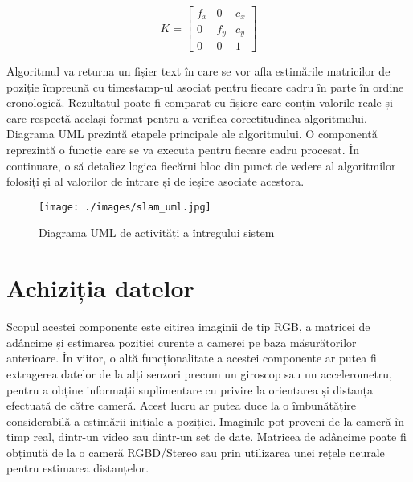 \documentclass[12pt,a4paper]{report}
\begin{document}
\begin{equation}
    K = 
    \begin{bmatrix}
        f_x & 0   & c_x \\
        0   & f_y & c_y \\
        0   & 0   & 1
    \end{bmatrix}
\end{equation}

Algoritmul va returna un fișier text în care se vor afla estimările matricilor 
de poziție împreună cu timestamp-ul asociat pentru fiecare cadru în parte în ordine
cronologică. Rezultatul poate fi comparat cu fișiere care conțin valorile reale și 
care respectă același format pentru a verifica corectitudinea algoritmului.   
Diagrama UML prezintă etapele principale ale algoritmului. O componentă 
reprezintă o funcție care se va executa pentru fiecare cadru procesat.  
În continuare, o să detaliez logica fiecărui bloc din punct de vedere al algoritmilor folosiți și 
al valorilor de intrare și de ieșire asociate acestora.

\begin{figure}[htbp] 
  \centering
  \texttt{[image: ./images/slam\_uml.jpg]}
  \caption{Diagrama UML de activități a întregului sistem}\label{fig:slam_uml_fig}
\end{figure}
 
\section{Achiziția datelor}
Scopul acestei componente este citirea imaginii de tip RGB, a matricei de adâncime 
și estimarea poziției curente a camerei pe baza măsurătorilor anterioare. În viitor,
o altă funcționalitate a acestei componente ar putea fi extragerea datelor de la alți senzori 
precum un giroscop sau un accelerometru, pentru a obține informații suplimentare cu privire
la orientarea și distanța efectuată de către cameră. Acest lucru ar putea duce la o îmbunătățire
considerabilă a estimării inițiale a poziției. Imaginile pot proveni de la cameră în timp real, 
dintr-un video sau dintr-un set de date. Matricea de adâncime poate fi obținută de la o cameră 
RGBD/Stereo sau prin utilizarea unei rețele neurale pentru estimarea distanțelor. 
\end{document}
